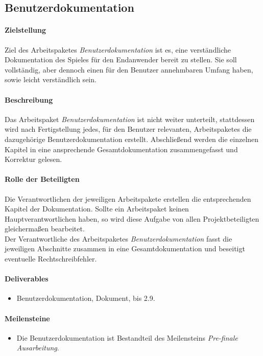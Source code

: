 \subsection{Benutzerdokumentation}
\label{ap9}

\paragraph{Zielstellung}\noindent
Ziel des Arbeitspaketes \textit{Benutzerdokumentation} ist es, eine verständliche Dokumentation des Spieles für den Endanwender bereit zu stellen. Sie soll vollständig, aber dennoch einen für den Benutzer annehmbaren Umfang haben, sowie leicht verständlich sein.

\paragraph{Beschreibung}\noindent
Das Arbeitspaket \textit{Benutzerdokumentation} ist nicht weiter unterteilt, stattdessen wird nach Fertigstellung jedes, für den Benutzer relevanten, Arbeitspaketes die dazugehörige Benutzerdokumentation erstellt. Abschließend werden die einzelnen Kapitel in eine ansprechende Gesamtdokumentation zusammengefasst und Korrektur gelesen.

\paragraph{Rolle der Beteiligten}\noindent
Die Verantwortlichen der jeweiligen Arbeitspakete erstellen die entsprechenden Kapitel der Dokumentation. Sollte ein Arbeitspaket keinen Hauptverantwortlichen haben, so wird diese Aufgabe von allen Projektbeteiligten gleichermaßen bearbeitet.\\
Der Verantwortliche des Arbeitspaketes \textit{Benutzerdokumentation} fasst die jeweiligen Abschnitte zusammen in eine Gesamtdokumentation und beseitigt eventuelle Rechtschreibfehler.

\paragraph{Deliverables}\noindent
\begin{itemize}
\item Benutzerdokumentation, Dokument, bis 2.9.
\end{itemize}

\paragraph{Meilensteine}\noindent
\begin{itemize}
\item Die Benutzerdokumentation ist Bestandteil des Meilensteins \textit{Pre-finale Ausarbeitung}.
\end{itemize}